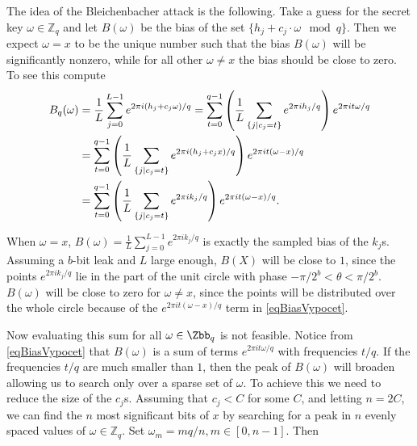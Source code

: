 \begin{example}
    
\end{example}
The idea of the Bleichenbacher attack is the following. Take a guess for the secret key $\omega \in \mathbb{Z}_q$ and let $B(\omega)$ be the bias of the set $\{h_j + c_j \cdot \omega \mod q\}$. Then we expect $\omega = x$ to be the unique number such that the bias $B(\omega)$ will be significantly nonzero, while for all other $\omega \not=x$ the bias should be close to zero. To see this compute 
\begin{align}
    B_q(\omega) 
    &= \frac{1}{L} \sum_{j=0}^{L-1} e^{2\pi i (h_j + c_j \omega)/q} 
    = \sum_{t=0}^{q-1} \left( \frac{1}{L} \sum_{\substack{\{j \mid c_j = t\}}} e^{2\pi i h_j / q} \right) e^{2\pi i t \omega / q} \notag\\
    &= \sum_{t=0}^{q-1} \left( \frac{1}{L} \sum_{\substack{\{j \mid c_j = t\}}} e^{2\pi i (h_j + c_j x)/q} \right) e^{2\pi i t (\omega - x)/q} \notag\\
    &= \sum_{t=0}^{q-1} \left( \frac{1}{L} \sum_{\substack{\{j \mid c_j = t\}}} e^{2\pi i k_j / q} \right) e^{2\pi i t (\omega - x)/q}. \label{eqBiasVypocet}
\end{align} 

When $\omega = x$, $B(\omega) = \frac{1}{L} \sum_{j=0}^{L-1} e^{2\pi i k_j / q}$ is exactly the sampled bias of the $k_j$s. Assuming a $b$-bit leak and $L$ large enough, $B(X)$ will be close to $1$, since the points $e^{2\pi i k_j /q}$ lie in the part of the unit circle with phase $-\pi/2^b < \theta < \pi/2^b$. $B(\omega)$ will be close to zero for $\omega \not =x$, since the points will be distributed over the whole circle because of the $e^{2\pi i t (\omega - x)/q}$ term in \eqref{eqBiasVypocet}.

Now evaluating this sum for all $\omega \in \Zbb_q$ is not feasible. Notice from \eqref{eqBiasVypocet} that $B(\omega)$ is a sum of terms $e^{2\pi i t \omega/q}$ with frequencies $t/q$. If the frequencies $t/q$ are much smaller than $1$, then the peak of $B(\omega)$ will broaden allowing us to search only over a sparse set of $\omega$. To achieve this we need to reduce the size of the $c_j$s. Assuming that $c_j < C$ for some $C$, and letting $n = 2C$, we can find the $n$ most significant bits of $x$ by searching for a peak in $n$ evenly spaced values of $\omega \in \mathbb{Z}_q$. Set $\omega_m = mq/n, m\in [0,n-1]$. Then 

